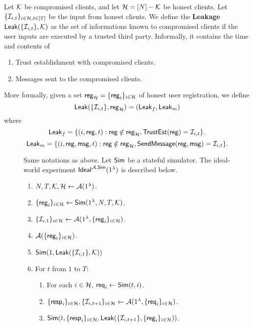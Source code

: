 \begin{definition}[Leakage]
Let $\mathcal{K}$ be compromised clients, and let $\mathcal{H} = [N] - \mathcal{K}$ be honest clients. Let $\{\mathcal{I}_{i, t}\}_{i \in \mathcal{H}, t \in [T]}$ be the input from honest clients. We define the \textbf{Leakage} $\mathsf{Leak}(\{\mathcal{I}_{i, t}\}, \mathcal{K})$ as the set of informations known to compromised clients if the user inputs are executed by a trusted third party. Informally, it contains the time and contents of
\begin{enumerate}
    \item Trust establishment with compromised clients.
    \item Messages sent to the compromised clients.
\end{enumerate}
More formally, given a set $\mathsf{reg}_{\mathcal{H}} = \{\mathsf{reg}_{i}\}_{i \in \mathcal{H}}$ of honest user registration, we define
$$\mathsf{Leak}(\{\mathcal{I}_{i, t}\}, \mathsf{reg}_{\mathcal{H}}) = (\mathsf{Leak}_f, \mathsf{Leak}_m)$$
where
$$\mathsf{Leak}_f = \{(i, \mathsf{reg}, t): \mathsf{reg} \notin \mathsf{reg}_{\mathcal{H}}, \mathsf{TrustEst}(\mathsf{reg}) = \mathcal{I}_{i, t}\}.$$
$$\mathsf{Leak}_m = \{(i, \mathsf{reg}, \mathsf{msg}, t): \mathsf{reg} \notin \mathsf{reg}_{\mathcal{H}}, \mathsf{SendMessage}(\mathsf{reg}, \mathsf{msg}) = \mathcal{I}_{i, t}\}.$$
\end{definition}
\begin{figure}[h!]
\begin{framed}
\begin{definition}
Same notations as above. Let $\mathsf{Sim}$ be a stateful simulator. The ideal-world experiment $\mathsf{Ideal}^{\mathcal{A}, \mathsf{Sim}}(1^{\lambda})$ is described below.
\begin{enumerate}
\item $N, T, \mathcal{K}, \mathcal{H} \leftarrow \mathcal{A}(1^{\lambda})$.
\item $\{\mathsf{reg}_i\}_{i \in \mathcal{H}} \leftarrow \mathsf{Sim}(1^{\lambda}, N, T, \mathcal{K})$. 
\item $\{\mathcal{I}_{i, 1}\}_{i \in \mathcal{H}} \leftarrow \mathcal{A}(1^{\lambda}, \{\mathsf{reg}_i\}_{i \in \mathcal{H}})$.
\item $\mathcal{A}(\{\mathsf{reg}_i\}_{i \in \mathcal{H}})$.
\item $\mathsf{Sim}(1, \mathsf{Leak}(\{\mathcal{I}_{i, 1}\}, \mathcal{K}))$
\item For $t$ from $1$ to $T$:
    \begin{enumerate}
    \item For each $i \in \mathcal{H}$, $\mathsf{req}_i \leftarrow \mathsf{Sim}(t, i)$.
    
    \item $\{\mathsf{resp}_i\}_{i \in \mathcal{H}}, \{\mathcal{I}_{i, t + 1}\}_{i \in \mathcal{H}} \leftarrow \mathcal{A}(1^{\lambda}, \{\mathsf{req}_i\}_{i \in \mathcal{H}})$.
    
    \item $\mathsf{Sim}(t, \{\mathsf{resp}_i\}_{i \in \mathcal{H}}, \mathsf{Leak}(\{\mathcal{I}_{i, t + 1}\}, \{\mathsf{reg}_i\}_{i \in \mathcal{H}}))$.
    \end{enumerate}
\end{enumerate}
\end{definition}
\end{framed}
\end{figure}
